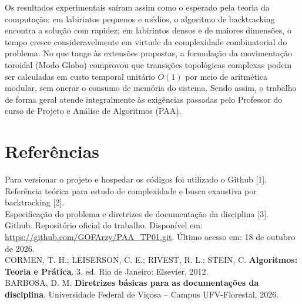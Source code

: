 \documentclass[12pt,a4paper]{article}
\renewcommand{\_}{\textunderscore\allowbreak}
\begin{document}
Os resultados experimentais saíram assim como o esperado pela teoria da computação: em labirintos pequenos e médios, o algoritmo de backtracking encontra a solução com rapidez; em labirintos densos e de maiores dimensões, o tempo cresce consideravelmente em virtude da complexidade combinatorial do problema. No que tange às extensões propostas, a formulação da movimentação toroidal (Modo Globo) comprovou que transições topológicas complexas podem ser calculadas em custo temporal unitário $O(1)$ por meio de aritmética modular, sem onerar o consumo de memória do sistema. Sendo assim, o trabalho de forma geral atende integralmente às exigências passadas pelo Professor do curso de Projeto e Análise de Algoritmos (PAA).

\section{Referências}

Para versionar o projeto e hospedar os códigos foi utilizado o Github [1].\\
Referência teórica para estudo de complexidade e busca exaustiva por backtracking [2].\\
Especificação do problema e diretrizes de documentação da disciplina [3].\\[0.6cm]

\noindent [1] Github. Repositório oficial do trabalho. Disponível em: \url{https://github.com/GOFArzy/PAA_TP01.git}. Último acesso em: 18 de outubro de 2026.\\[0.35cm]
\noindent [2] CORMEN, T. H.; LEISERSON, C. E.; RIVEST, R. L.; STEIN, C. \textbf{Algoritmos: Teoria e Prática}. 3. ed. Rio de Janeiro: Elsevier, 2012.\\[0.35cm]
\noindent [3] BARBOSA, D. M. \textbf{Diretrizes básicas para as documentações da disciplina}. Universidade Federal de Viçosa -- Campus UFV-Florestal, 2026.
\end{document}
